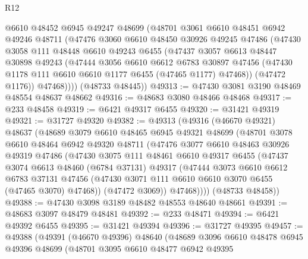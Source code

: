 \begin{lexlean}{R12}
\begin{coremodule}
        @6610
        @48452
        @6945
        @49247
        @48699
        (@48701
          @3061
          @6610
          @48451
          @6942
          @49246
          @48711
          (@47476
            @3060
            @6610
            @48450
            @30926
            @49245
            @47486
            (@47430
              @3058
              @111
              @48448
              @6610
              @49243
              @6455
              (@47437
                @3057
                @6613
                @48447
                @30898
                @49243
                (@47444
                  @3056
                  @6610
                  @6612
                  @6783
                  @30897
                  @47456
                  (@47430 @1178 @111 @6610 @6610 @1177 @6455 (@47465 @1177) @47468))
                (@47472 @1176))
              @47468))))
      (@48733 @48445))
@49313 := @47430 @3081 @3190 @48469 @48554 @48637 @48662
@49316 := @48683 @3080 @48466 @48468
@49317 := @233 @48458
@49319 := @6421 @49317 @6455
@49320 := @31421 @49319
@49321 := @31727 @49320
@49382 := @49313
    (@49316
      (@46670 @49321)
      @48637
      (@48689
        @3079
        @6610
        @48465
        @6945
        @49321
        @48699
        (@48701
          @3078
          @6610
          @48464
          @6942
          @49320
          @48711
          (@47476
            @3077
            @6610
            @48463
            @30926
            @49319
            @47486
            (@47430
              @3075
              @111
              @48461
              @6610
              @49317
              @6455
              (@47437
                @3074
                @6613
                @48460
                (@6784 @37131)
                @49317
                (@47444
                  @3073
                  @6610
                  @6612
                  @6783
                  @37131
                  @47456
                  (@47430 @3071 @111 @6610 @6610 @3070 @6455 (@47465 @3070) @47468))
                (@47472 @3069))
              @47468))))
      (@48733 @48458))
@49388 := @47430 @3098 @3189 @48482 @48553 @48640 @48661
@49391 := @48683 @3097 @48479 @48481
@49392 := @233 @48471
@49394 := @6421 @49392 @6455
@49395 := @31421 @49394
@49396 := @31727 @49395
@49457 := @49388
    (@49391
      (@46670 @49396)
      @48640
      (@48689
        @3096
        @6610
        @48478
        @6945
        @49396
        @48699
        (@48701
          @3095
          @6610
          @48477
          @6942
          @49395

\end{coremodule}
\end{lexlean}
